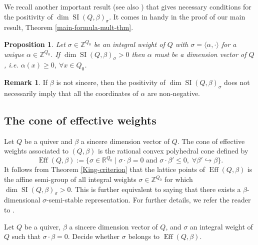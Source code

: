\documentclass[11pt]{article}
\newtheorem{prop}[theo]{Proposition}
\theoremstyle{definition}
\newtheorem{rema}[theo]{Remark}
\numberwithin{equation}{section}
\newcommand{\SI}{\operatorname{SI}}
\newcommand{\ZZ}{\mathbb Z}
\newcommand{\RR}{\mathbb R}
\newcommand{\Eff}{\operatorname{Eff}}
\begin{document}
We recall another important result \cite[Lemma 6.5.7]{IOTW} (see also \cite[Lemma 3]{ChiGra-2019}) that gives necessary conditions for the positivity of $\dim \SI(Q,\beta)_{\sigma}$. It comes in handy in the proof of our main result,  Theorem \ref{main-formula-mult-thm}.

\begin{prop}\label{wt-dim-vector-prop} Let $\sigma \in \ZZ^{Q_0}$ be an integral weight of $Q$ with $\sigma=\langle \alpha, \cdot \rangle$ for a unique $\alpha \in \ZZ^{Q_0}$. If $\dim \SI(Q, \beta)_{\sigma}>0$ then $\alpha$ must be a dimension vector of $Q$, i.e. $\alpha(x) \geq 0$, $\forall x \in Q_0$.
\end{prop}

\begin{rema} If $\beta$ is not sincere, then the positivity of $\dim \SI(Q, \beta)_\sigma$ does not necessarily imply that all the coordinates of $\alpha$ are non-negative. 
\end{rema}
 
\subsection{The cone of effective weights}

Let $Q$ be a quiver and $\beta$ a sincere dimension vector of $Q$. The cone of effective weights associated to $(Q, \beta)$ is the rational convex polyhedral cone defined by
$$
\Eff(Q, \beta):=\{\sigma \in \RR^{Q_0} \mid \sigma \cdot \beta=0 \text{~and~}\sigma \cdot \beta'\leq 0, \; \forall \beta' \hookrightarrow \beta\}.
$$
It follows from Theorem \ref{King-criterion} that the lattice points of $\Eff(Q, \beta)$ is the affine semi-group of all integral weights $\sigma \in \ZZ^{Q_0}$ for which $\dim \SI(Q, \beta)_\sigma >0$. This is further equivalent to saying that there exists a $\beta$-dimensional $\sigma$-semi-stable representation. For further details, we refer the reader to \cite{DW1, DW2, SVB}.

\begin{problem}\label{gen-semi-stab-problem}
Let $Q$ be a quiver, $\beta$ a sincere dimension vector of $Q$, and $\sigma$ an integral weight of $Q$ such that $\sigma \cdot \beta=0$. Decide whether $\sigma$ belongs to $\Eff(Q, \beta)$.
\end{problem}
\end{document}

